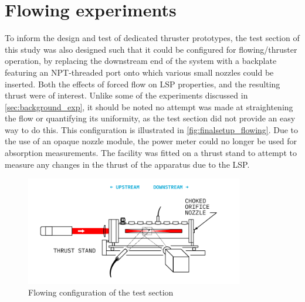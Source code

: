     \section{Flowing experiments}
        To inform the design and test of dedicated thruster prototypes, the test section of this study was also designed such that it could be configured for flowing/thruster operation, by replacing the downstream end of the system with a backplate featuring an NPT-threaded port onto which various small nozzles could be inserted. Both the effects of forced flow on LSP properties, and the resulting thrust were of interest. Unlike some of the experiments discussed in \autoref{sec:background_exp}, it should be noted no attempt was made at straightening the flow or quantifying its uniformity, as the test section did not provide an easy way to do this. This configuration is illustrated in \autoref{fig:finalsetup_flowing}. Due to the use of an opaque nozzle module, the power meter could no longer be used for absorption measurements. The facility was fitted on a thrust stand to attempt to measure any changes in the thrust of the apparatus due to the LSP.

        \begin{figure}[h]
            \centering
            \includegraphics[width=0.85\textwidth]{assets/5 results/finalsetup_flowing}
            \caption{Flowing configuration of the test section}
            \label{fig:finalsetup_flowing}
        \end{figure}

